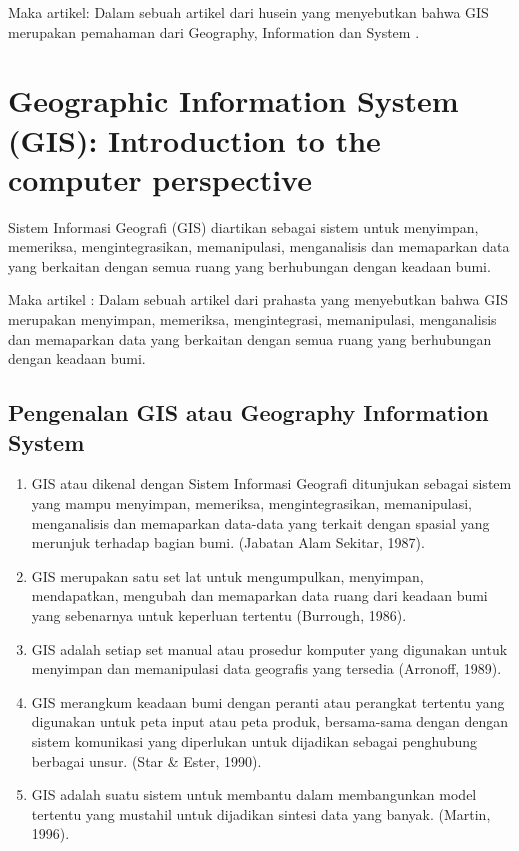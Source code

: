 Maka artikel:
	Dalam sebuah artikel dari husein yang menyebutkan bahwa  GIS merupakan pemahaman dari
	Geography, Information dan System \cite{husein2006konsep}.

\section{Geographic Information System (GIS): Introduction to the computer perspective}
Sistem Informasi Geografi (GIS) diartikan sebagai sistem untuk menyimpan, memeriksa, 
mengintegrasikan, memanipulasi, menganalisis dan memaparkan data yang berkaitan dengan semua 
ruang yang berhubungan dengan keadaan bumi.

Maka artikel :
	Dalam sebuah artikel dari prahasta yang menyebutkan bahwa  GIS merupakan menyimpan, memeriksa, mengintegrasi, memanipulasi, menganalisis dan memaparkan data yang berkaitan dengan semua ruang yang berhubungan dengan keadaan bumi\cite{prahasta2009sistem}.

\subsection{Pengenalan GIS atau Geography Information System}
\begin{enumerate}
	
\item GIS atau dikenal dengan Sistem Informasi Geografi ditunjukan sebagai sistem yang mampu menyimpan, memeriksa, mengintegrasikan, memanipulasi, menganalisis dan memaparkan data-data yang terkait dengan spasial yang merunjuk terhadap bagian bumi. (Jabatan Alam Sekitar, 1987).

\item GIS merupakan satu set lat untuk mengumpulkan, menyimpan, mendapatkan, mengubah dan memaparkan data ruang dari keadaan  bumi yang sebenarnya untuk keperluan tertentu (Burrough, 1986).


\item GIS adalah setiap set manual atau prosedur komputer yang digunakan untuk menyimpan dan memanipulasi data geografis yang tersedia (Arronoff, 1989).


\item GIS merangkum keadaan bumi dengan peranti atau perangkat tertentu yang digunakan untuk peta input atau peta produk, bersama-sama dengan dengan sistem komunikasi yang diperlukan untuk dijadikan sebagai penghubung berbagai unsur. (Star \& Ester, 1990).

\item GIS adalah suatu sistem untuk membantu dalam membangunkan model tertentu yang mustahil untuk dijadikan sintesi data yang banyak. (Martin, 1996).

\end{enumerate}

